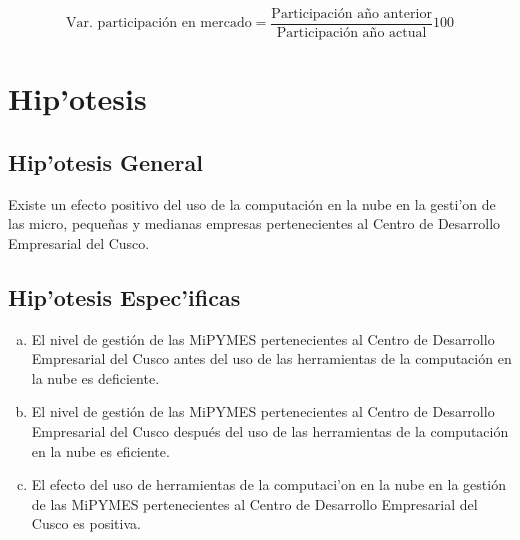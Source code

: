 \begin{equation}\label{eq:competitividad2}
    \text{Var. participaci\'on en mercado} = \frac{\text{Participaci\'on a\~no anterior}}{\text{Participaci\'on a\~no actual}}\text{100}
\end{equation}


\section{Hip'otesis}

\subsection{Hip'otesis General}

Existe un efecto positivo del uso de la computaci\'on en la nube en la
gesti'on de las micro, peque\~nas y medianas empresas pertenecientes al Centro de
Desarrollo Empresarial del Cusco.

\subsection{Hip'otesis Espec'ificas}
\begin{enumerate}[a.]
    \item El nivel de gesti\'on de las MiPYMES pertenecientes al Centro de Desarrollo
          Empresarial del Cusco antes del uso de las herramientas de la computaci\'on
          en la nube es deficiente.
    \item El nivel de gesti\'on de las MiPYMES pertenecientes al Centro de Desarrollo
          Empresarial del Cusco despu\'es del uso de las herramientas de la computaci\'on
          en la nube es eficiente.
    \item El efecto del uso de herramientas de la computaci'on en la nube en la
          gesti\'on de las MiPYMES pertenecientes al Centro de Desarrollo Empresarial
          del Cusco es positiva.
\end{enumerate}

